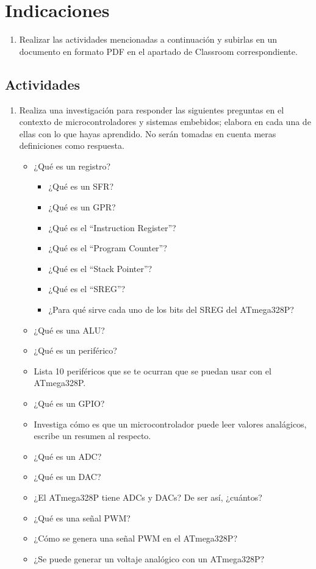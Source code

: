 \documentclass[11pt,letterpaper]{article}
\begin{document}
\section*{Indicaciones}
\begin{enumerate}[label=(\roman*)]
    \item Realizar las actividades mencionadas a continuación y subirlas en un documento en formato PDF en el apartado de Classroom correspondiente. 
\end{enumerate}
\subsection*{Actividades}
\begin{enumerate}[label=\arabic*)]
    \item Realiza una investigación para responder las siguientes preguntas en el contexto de microcontroladores y sistemas embebidos; elabora en cada una de ellas con lo que hayas aprendido. No serán tomadas en cuenta meras definiciones como respuesta.
    \begin{itemize}
        \item ¿Qué es un registro?
        \begin{itemize}
            \item ¿Qué es un SFR?
            \item ¿Qué es un GPR?
            \item ¿Qué es el ``Instruction Register''?
            \item ¿Qué es el ``Program Counter''?
            \item ¿Qué es el ``Stack Pointer''?
            \item ¿Qué es el ``SREG''?
            \item ¿Para qué sirve cada uno de los bits del SREG del ATmega328P?
        \end{itemize}
        \item ¿Qué es una ALU?
        \item ¿Qué es un periférico?
        \item Lista 10 periféricos que se te ocurran que se puedan usar con el ATmega328P.
        \item ¿Qué es un GPIO?
        \item Investiga cómo es que un microcontrolador puede leer valores analágicos, escribe un resumen al respecto.
        \item ¿Qué es un ADC?
        \item ¿Qué es un DAC?
        \item ¿El ATmega328P tiene ADCs y DACs? De ser así, ¿cuántos?
        \item ¿Qué es una señal PWM?
        \item ¿Cómo se genera una señal PWM en el ATmega328P?
        \item ¿Se puede generar un voltaje analógico con un ATmega328P?
    \end{itemize}
\end{enumerate}
\end{document}
